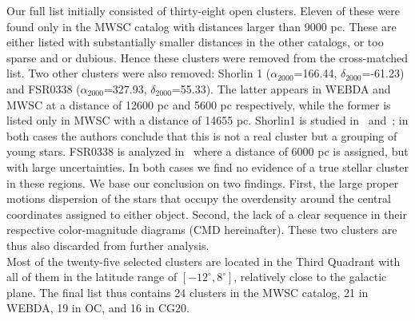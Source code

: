 \documentclass[draft]{aa}
\begin{document}
 Our full list initially consisted of thirty-eight open clusters. Eleven of
 these were found only in the MWSC catalog with distances larger than 9000 pc.
 These are either listed with substantially smaller distances in the other
 catalogs, or too sparse and or dubious. Hence these clusters were removed from
 the cross-matched list.
 Two other clusters were also removed: Shorlin 1 ($\alpha_{2000}$=166.44,
 $\delta_{2000}$=-61.23) and FSR0338
 ($\alpha_{2000}$=327.93, $\delta_{2000}$=55.33). The latter appears in WEBDA and
 MWSC at a distance of 12600 pc and 5600 pc respectively, while the former is
 listed only in MWSC with a distance of 14655 pc. Shorlin1 is studied
 in~\cite{Carraro_2009} and~\cite{Turner_2012}; in both cases the authors
 conclude that this is not a real cluster but a grouping of young stars.
 FSR0338 is analyzed in~\cite{Froebrich_2010} where a distance of 6000 pc is
 assigned, but with large uncertainties.
 In both cases we find no evidence of a true stellar cluster in these regions.
 We base our conclusion on two findings. First, the large proper motions
 dispersion of the stars that occupy the overdensity around the central
 coordinates assigned to either object. Second, the lack of a clear sequence in
 their respective color-magnitude diagrams (CMD hereinafter). These two clusters
 are thus also discarded from further analysis.\\

 Most of the twenty-five selected clusters are located in the Third Quadrant
 with all of them in the latitude range of $\left[-12^{\circ}, 8^{\circ}\right]$,
 relatively close to the galactic plane. The final list thus contains 24
 clusters in the MWSC catalog, 21 in WEBDA, 19 in OC, and 16 in CG20.
\end{document}
